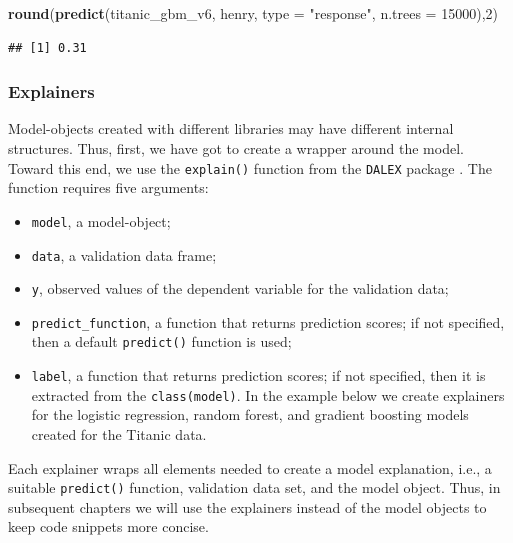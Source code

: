 \documentclass[12pt,]{krantz}
\newenvironment{Shaded}{\begin{snugshade}}{\end{snugshade}}
\newcommand{\DataTypeTok}[1]{\textcolor[rgb]{0.13,0.29,0.53}{#1}}
\newcommand{\DecValTok}[1]{\textcolor[rgb]{0.00,0.00,0.81}{#1}}
\newcommand{\KeywordTok}[1]{\textcolor[rgb]{0.13,0.29,0.53}{\textbf{#1}}}
\newcommand{\NormalTok}[1]{#1}
\newcommand{\StringTok}[1]{\textcolor[rgb]{0.31,0.60,0.02}{#1}}
\providecommand{\tightlist}{%
  \setlength{\itemsep}{0pt}\setlength{\parskip}{0pt}}
\begin{document}
\begin{Shaded}
\begin{Highlighting}[]
\KeywordTok{round}\NormalTok{(}\KeywordTok{predict}\NormalTok{(titanic_gbm_v6, henry, }\DataTypeTok{type =} \StringTok{"response"}\NormalTok{, }\DataTypeTok{n.trees =} \DecValTok{15000}\NormalTok{),}\DecValTok{2}\NormalTok{)}
\end{Highlighting}
\end{Shaded}

\begin{verbatim}
## [1] 0.31
\end{verbatim}

\hypertarget{ExplainersTitanicRCode}{%
\subsubsection{Explainers}\label{ExplainersTitanicRCode}}

Model-objects created with different libraries may have different internal structures. Thus, first, we have got to create a wrapper around the model. Toward this end, we use the \texttt{explain()} function from the \texttt{DALEX} package \citep{DALEX}. The function requires five arguments:

\begin{itemize}
\tightlist
\item
  \texttt{model}, a model-object;
\item
  \texttt{data}, a validation data frame;
\item
  \texttt{y}, observed values of the dependent variable for the validation data;
\item
  \texttt{predict\_function}, a function that returns prediction scores; if not specified, then a default \texttt{predict()} function is used;
\item
  \texttt{label}, a function that returns prediction scores; if not specified, then it is extracted from the \texttt{class(model)}.
  In the example below we create explainers for the logistic regression, random forest, and gradient boosting models created for the Titanic data.
\end{itemize}

Each explainer wraps all elements needed to create a model explanation, i.e., a suitable \texttt{predict()} function, validation data set, and the model object. Thus, in subsequent chapters we will use the explainers instead of the model objects to keep code snippets more concise.
\end{document}
